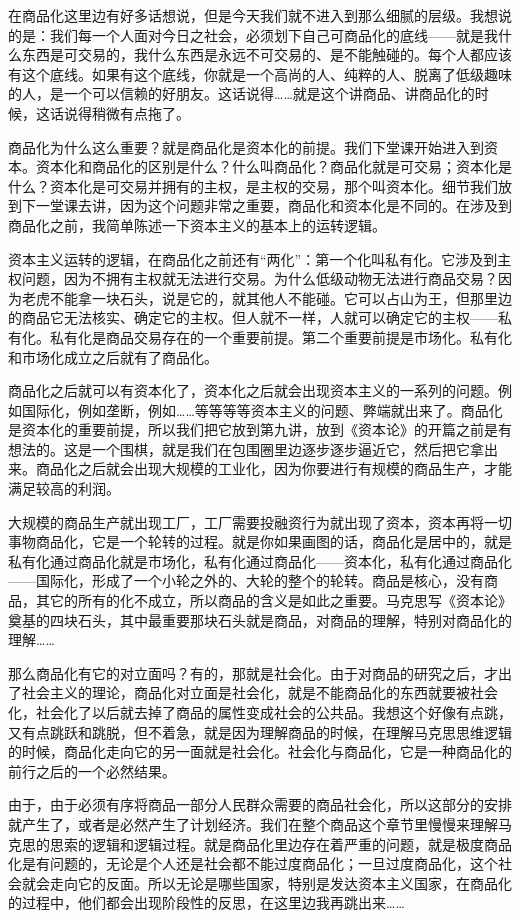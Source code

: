 \documentclass[UTF8, 12pt, a4paper]{ctexrep}
\begin{document}
在商品化这里边有好多话想说，但是今天我们就不进入到那么细腻的层级。我想说的是：我们每一个人面对今日之社会，必须划下自己可商品化的底线——就是我什么东西是可交易的，我什么东西是永远不可交易的、是不能触碰的。每个人都应该有这个底线。如果有这个底线，你就是一个高尚的人、纯粹的人、脱离了低级趣味的人，是一个可以信赖的好朋友。这话说得……就是这个讲商品、讲商品化的时候，这话说得稍微有点拖了。

商品化为什么这么重要？就是商品化是资本化的前提。我们下堂课开始进入到资本。资本化和商品化的区别是什么？什么叫商品化？商品化就是可交易；资本化是什么？资本化是可交易并拥有的主权，是主权的交易，那个叫资本化。细节我们放到下一堂课去讲，因为这个问题非常之重要，商品化和资本化是不同的。在涉及到商品化之前，我简单陈述一下资本主义的基本上的运转逻辑。

资本主义运转的逻辑，在商品化之前还有“两化”：第一个化叫私有化。它涉及到主权问题，因为不拥有主权就无法进行交易。为什么低级动物无法进行商品交易？因为老虎不能拿一块石头，说是它的，就其他人不能碰。它可以占山为王，但那里边的商品它无法核实、确定它的主权。但人就不一样，人就可以确定它的主权——私有化。私有化是商品交易存在的一个重要前提。第二个重要前提是市场化。私有化和市场化成立之后就有了商品化。

商品化之后就可以有资本化了，资本化之后就会出现资本主义的一系列的问题。例如国际化，例如垄断，例如……等等等等资本主义的问题、弊端就出来了。商品化是资本化的重要前提，所以我们把它放到第九讲，放到《资本论》的开篇之前是有想法的。这是一个围棋，就是我们在包围圈里边逐步逐步逼近它，然后把它拿出来。商品化之后就会出现大规模的工业化，因为你要进行有规模的商品生产，才能满足较高的利润。

大规模的商品生产就出现工厂，工厂需要投融资行为就出现了资本，资本再将一切事物商品化，它是一个轮转的过程。就是你如果画图的话，商品化是居中的，就是私有化通过商品化就是市场化，私有化通过商品化——资本化，私有化通过商品化——国际化，形成了一个小轮之外的、大轮的整个的轮转。商品是核心，没有商品，其它的所有的化不成立，所以商品的含义是如此之重要。马克思写《资本论》奠基的四块石头，其中最重要那块石头就是商品，对商品的理解，特别对商品化的理解……

那么商品化有它的对立面吗？有的，那就是社会化。由于对商品的研究之后，才出了社会主义的理论，商品化对立面是社会化，就是不能商品化的东西就要被社会化，社会化了以后就去掉了商品的属性变成社会的公共品。我想这个好像有点跳，又有点跳跃和跳脱，但不着急，就是因为理解商品的时候，在理解马克思思维逻辑的时候，商品化走向它的另一面就是社会化。社会化与商品化，它是一种商品化的前行之后的一个必然结果。

由于，由于必须有序将商品一部分人民群众需要的商品社会化，所以这部分的安排就产生了，或者是必然产生了计划经济。我们在整个商品这个章节里慢慢来理解马克思的思索的逻辑和逻辑过程。就是商品化里边存在着严重的问题，就是极度商品化是有问题的，无论是个人还是社会都不能过度商品化；一旦过度商品化，这个社会就会走向它的反面。所以无论是哪些国家，特别是发达资本主义国家，在商品化的过程中，他们都会出现阶段性的反思，在这里边我再跳出来……
\end{document}
